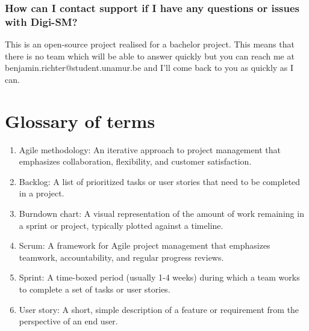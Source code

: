 \documentclass{article}
\begin{document}
\subsubsection{How can I contact support if I have any questions or issues with Digi-SM?
}

This is an open-source project realised for a bachelor project. This means that there is no team which will be able to answer quickly but you can reach me at benjamin.richter@student.unamur.be and I'll come back to you as quickly as I can.

\newpage

\section{Glossary of terms}

\begin{enumerate}
\item Agile methodology: An iterative approach to project management that emphasizes collaboration, flexibility, and customer satisfaction.
\item Backlog: A list of prioritized tasks or user stories that need to be completed in a project.
\item Burndown chart: A visual representation of the amount of work remaining in a sprint or project, typically plotted against a timeline.
\item Scrum: A framework for Agile project management that emphasizes teamwork, accountability, and regular progress reviews.
\item Sprint: A time-boxed period (usually 1-4 weeks) during which a team works to complete a set of tasks or user stories.
\item User story: A short, simple description of a feature or requirement from the perspective of an end user.
\end{enumerate}
\end{document}
